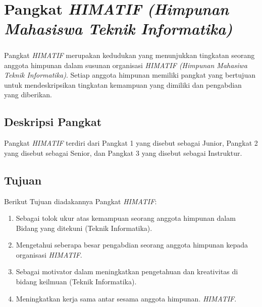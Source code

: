 \chapter{Pangkat \textit{HIMATIF} \textit{(Himpunan Mahasiswa Teknik Informatika)}}
\par
\paragraph{}Pangkat \textit{HIMATIF} merupakan kedudukan yang menunjukkan tingkatan seorang anggota himpunan dalam susunan organisasi \textit{HIMATIF (Himpunan Mahasiwa Teknik Informatika)}. Setiap anggota himpunan memiliki pangkat yang bertujuan untuk mendeskripsikan tingkatan kemampuan yang dimiliki dan pengabdian yang diberikan. 

\section{Deskripsi Pangkat}
Pangkat \textit{HIMATIF} terdiri dari Pangkat 1 yang disebut sebagai Junior, Pangkat 2 yang disebut sebagai Senior, dan Pangkat 3 yang disebut sebagai Instruktur.

\section{Tujuan}
Berikut Tujuan diadakannya Pangkat \textit{HIMATIF}:
\begin{enumerate}
 \item Sebagai tolok ukur atas kemampuan seorang anggota himpunan dalam Bidang yang ditekuni (Teknik Informatika).
 \item Mengetahui seberapa besar pengabdian seorang anggota himpunan kepada organisasi \textit{HIMATIF}.
 \item Sebagai motivator dalam meningkatkan pengetahuan dan kreativitas di bidang keilmuan (Teknik Informatika).
 \item Meningkatkan kerja sama antar sesama anggota himpunan. \textit{HIMATIF}.
\end{enumerate}
